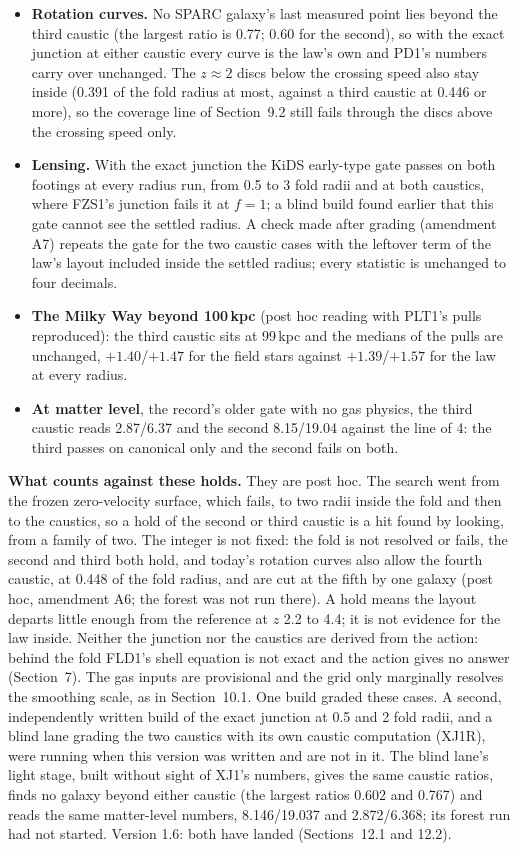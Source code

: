 \documentclass[10pt]{article}
\begin{document}
\begin{itemize}
\item \textbf{Rotation curves.} No SPARC galaxy's last measured point lies beyond the third caustic (the largest ratio is 0.77; 0.60 for the second), so with the exact junction at either caustic every curve is the law's own and PD1's numbers carry over unchanged. The $z\approx2$ discs below the crossing speed also stay inside (0.391 of the fold radius at most, against a third caustic at 0.446 or more), so the coverage line of Section~9.2 still fails through the discs above the crossing speed only.
\item \textbf{Lensing.} With the exact junction the KiDS early-type gate passes on both footings at every radius run, from 0.5 to 3 fold radii and at both caustics, where FZS1's junction fails it at $f=1$; a blind build found earlier that this gate cannot see the settled radius. A check made after grading (amendment A7) repeats the gate for the two caustic cases with the leftover term of the law's layout included inside the settled radius; every statistic is unchanged to four decimals.
\item \textbf{The Milky Way beyond 100\,kpc} (post hoc reading with PLT1's pulls reproduced): the third caustic sits at 99\,kpc and the medians of the pulls are unchanged, $+1.40$/$+1.47$ for the field stars against $+1.39$/$+1.57$ for the law at every radius.
\item \textbf{At matter level}, the record's older gate with no gas physics, the third caustic reads 2.87/6.37 and the second 8.15/19.04 against the line of 4: the third passes on canonical only and the second fails on both.
\end{itemize}
\textbf{What counts against these holds.} They are post hoc. The search went from the frozen zero-velocity surface, which fails, to two radii inside the fold and then to the caustics, so a hold of the second or third caustic is a hit found by looking, from a family of two. The integer is not fixed: the fold is not resolved or fails, the second and third both hold, and today's rotation curves also allow the fourth caustic, at 0.448 of the fold radius, and are cut at the fifth by one galaxy (post hoc, amendment A6; the forest was not run there). A hold means the layout departs little enough from the reference at $z$ 2.2 to 4.4; it is not evidence for the law inside. Neither the junction nor the caustics are derived from the action: behind the fold FLD1's shell equation is not exact and the action gives no answer (Section~7). The gas inputs are provisional and the grid only marginally resolves the smoothing scale, as in Section~10.1. One build graded these cases. A second, independently written build of the exact junction at 0.5 and 2 fold radii, and a blind lane grading the two caustics with its own caustic computation (XJ1R), were running when this version was written and are not in it. The blind lane's light stage, built without sight of XJ1's numbers, gives the same caustic ratios, finds no galaxy beyond either caustic (the largest ratios 0.602 and 0.767) and reads the same matter-level numbers, 8.146/19.037 and 2.872/6.368; its forest run had not started. Version 1.6: both have landed (Sections~12.1 and 12.2).
\end{document}

